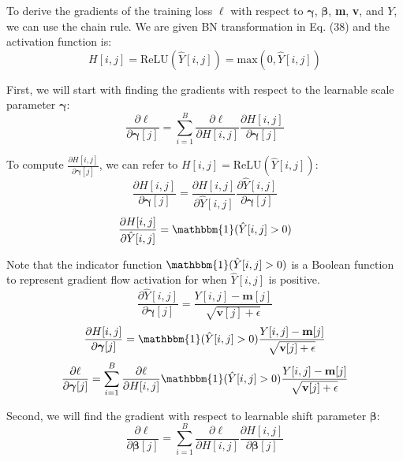\documentclass{article}
\begin{document}
{\color{blue}
To derive the gradients of the training loss $\ell$ with respect to $\boldsymbol{\gamma}$, $\boldsymbol{\beta}$, \textbf{m}, \textbf{v}, and $Y$, we can use the chain rule. We are given BN transformation in Eq. (38) and the activation function is:
\begin{equation}
    H[i,j]=\text{ReLU}(\hat{Y}[i,j])=\text{max}(0,\hat{Y}[i,j])
\end{equation}

First, we will start with finding the gradients with respect to the learnable scale parameter $\boldsymbol{\gamma}$:
\begin{equation}
    \frac{\partial \ell}{\partial \boldsymbol{\gamma}[j]}= \sum_{i=1}^{B} \frac{\partial \ell}{\partial H[i,j]} \frac{\partial H[i,j]}{\partial \boldsymbol{\gamma}[j]}
\end{equation}

To compute $\frac{\partial H[i,j]}{\partial \boldsymbol{\gamma}[j]}$, we can refer to $H[i,j]= \text{ReLU}(\hat{Y}[i,j])$:
\begin{equation}
    \frac{\partial H[i,j]}{\partial \boldsymbol{\gamma}[j]}= \frac{\partial H[i,j]}{\partial \hat{Y}[i,j]} \frac{\partial \hat{Y}[i,j]}{\partial \boldsymbol{\gamma}[j]}
\end{equation}
\begin{equation}
    \frac{\partial H[i,j]}{\partial \hat{Y}[i,j]}= \mathbbm{1}(\hat{Y}[i,j]>0)
\end{equation}

Note that the indicator function $\mathbbm{1}(\hat{Y}[i,j]>0)$ is a Boolean function to represent gradient flow activation for when $\hat{Y}[i,j]$ is positive.
\begin{equation}
    \frac{\partial \hat{Y}[i,j]}{\partial \boldsymbol{\gamma}[j]}= \frac{Y[i,j]-\textbf{m}[j]}{\sqrt{\textbf{v}[j]+ \epsilon}}
\end{equation}
\begin{equation}
    \frac{\partial H[i,j]}{\partial \boldsymbol{\gamma}[j]}= \mathbbm{1}(\hat{Y}[i,j]>0) \frac{Y[i,j]-\textbf{m}[j]}{\sqrt{\textbf{v}[j]+ \epsilon}}
\end{equation}
\begin{equation}
    \frac{\partial \ell}{\partial \boldsymbol{\gamma}[j]}= \sum_{i=1}^{B} \frac{\partial \ell}{\partial H[i,j]} \mathbbm{1}(\hat{Y}[i,j]>0) \frac{Y[i,j]-\textbf{m}[j]}{\sqrt{\textbf{v}[j]+ \epsilon}}
\end{equation}

Second, we will find the gradient with respect to learnable shift parameter $\boldsymbol{\beta}$:
\begin{equation}
    \frac{\partial \ell}{\partial \boldsymbol{\beta}[j]}= \sum_{i=1}^{B} \frac{\partial \ell}{\partial H[i,j]} \frac{\partial H[i,j]}{\partial \boldsymbol{\beta}[j]}
\end{equation}

}
\end{document}
